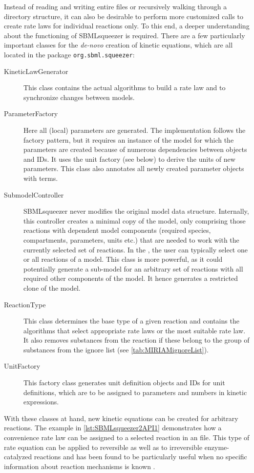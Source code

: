 Instead of reading and writing entire files or recursively walking through a directory structure, it can also be desirable to perform more customized calls to create rate laws for individual reactions only.
To this end, a deeper understanding about the functioning of SBMLsqueezer is required.
There are a few particularly important classes for the \emph{de-novo} creation of kinetic equations, which are all located in the package \texttt{org.sbml.squeezer}:
\begin{description}
  \item[KineticLawGenerator] This class contains the actual algorithms to build a rate law and to synchronize changes between models.
  \item[ParameterFactory]
    Here all (local) parameters are generated.
    The implementation follows the factory pattern, but it requires an instance of the model for which the parameters are created because of numerous dependencies between objects and \acp{ID}.
    It uses the unit factory (see below) to derive the units of new parameters.
    This class also annotates all newly created parameter objects with \SBO terms.
  \item[SubmodelController]
    SBMLsqueezer never modifies the original model data structure.
    Internally, this controller creates a minimal copy of the model, only comprising those reactions with dependent model components (required species, compartments, parameters, units etc.) that are needed to work with the currently selected set of reactions.
    In the \GUI, the user can typically select one or all reactions of a model.
    This class is more powerful, as it could potentially generate a sub-model for an arbitrary set of reactions with all required other components of the model.
    It hence generates a restricted clone of the model.
  \item[ReactionType]
    This class determines the base type of a given reaction and contains the algorithms that select appropriate rate laws or the most suitable rate law.
    It also removes substances from the reaction if these belong to the group of substances from the ignore list (see  \vref{tab:MIRIAMignoreList}).
  \item[UnitFactory]
    This factory class generates unit definition objects and \acp{ID} for unit definitions, which are to be assigned to parameters and numbers in kinetic expressions.
\end{description}
\renewcommand{\descriptionlabel}[1]{\textcolor{black}{\textbf{#1}}}
With these classes at hand, new kinetic equations can be created for arbitrary reactions.
The example in \vref{lst:SBMLsqueezer2API1} demonstrates how a convenience rate law \citep{Liebermeister2006} can be assigned to a selected reaction in an \SBML file.
This type of rate equation can be applied to reversible as well as to irreversible enzyme-catalyzed reactions and has been found to be particularly useful when no specific information about reaction mechanisms is known \citep{Draeger2007b, Draeger2009a, Draeger2011a}.


